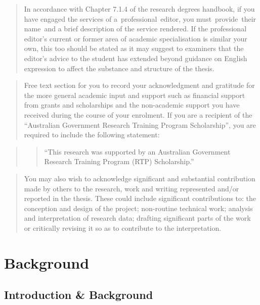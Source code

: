 \documentclass[
  letterpaper,
  DIV=11,
  numbers=noendperiod]{scrreprt}
\begin{document}
\begin{quote}
In accordance with Chapter 7.1.4 of the research degrees handbook, if
you have engaged the services of a~professional~editor, you
must~provide~their name~and a brief description of the service rendered.
If the professional editor's current or former area of academic
specialisation is similar your own, this too should be stated as it may
suggest to examiners that the editor's advice to the student has
extended beyond guidance on English expression to affect the substance
and structure of the thesis.
\end{quote}

\begin{quote}
Free text section for you to record your acknowledgment and gratitude
for the more general academic input and support such as financial
support from grants and scholarships and the non-academic support you
have received during the course of your enrolment. If you are a
recipient of the ``Australian Government Research Training Program
Scholarship'', you are required to include the following statement:
\end{quote}

\begin{quote}
\begin{quote}
``This research was supported by an Australian Government Research
Training Program (RTP) Scholarship.''
\end{quote}
\end{quote}

\begin{quote}
You may also wish to acknowledge significant and substantial
contribution made by others to the research, work and writing
represented and/or reported in the thesis. These could include
significant contributions to: the conception and design of the project;
non-routine technical work; analysis and interpretation of research
data; drafting significant parts of the work or critically revising it
so as to contribute to the interpretation.
\end{quote}

\clearpage{}\setcounter{page}{0}

\part{Background}

\hypertarget{sec-intro}{%
\chapter{Introduction \& Background}\label{sec-intro}}
\end{document}
